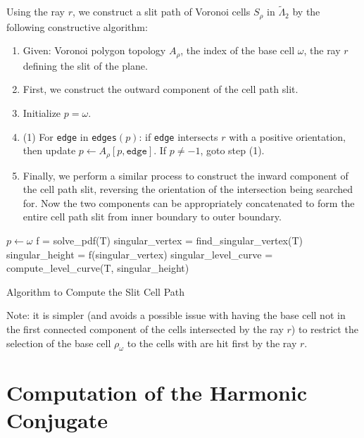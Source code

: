 \documentclass{article}
\begin{document}
Using the ray $r$, we construct a slit path of Voronoi cells $S_\rho$ in $\tilde{\Lambda}_2$ by the following constructive algorithm:
\begin{enumerate}
	\item Given: Voronoi polygon topology $A_\rho$, the index of the base cell $\omega$, the ray $r$ defining the slit of the plane.
	\item First, we construct the outward component of the cell path slit.
	\item Initialize $p = \omega$.
	\item (1) For \texttt{edge} in \texttt{edges}$(p)$:
	if \texttt{edge} intersects $r$ with a positive orientation, then update $p \leftarrow A_\rho[p, \texttt{edge}]$. If $p \ne -1$, goto step (1).
	\item Finally, we perform a similar process to construct the inward component of the cell path slit, reversing the orientation of the intersection being searched for. Now the two components can be appropriately concatenated to form the entire cell path slit from inner boundary to outer boundary.
\end{enumerate}

\begin{algorithm}%
	\SetAlgoLined
	\LinesNumbered
	\DontPrintSemicolon
	$p \leftarrow \omega$\;
	f = solve\_pdf(T)\;
	singular\_vertex = find\_singular\_vertex(T)\;
	singular\_height = f(singular\_vertex)\;
	singular\_level\_curve = compute\_level\_curve(T, singular\_height)\;
	\caption{Algorithm to Compute the Slit Cell Path}
\end{algorithm}

Note: it is simpler (and avoids a possible issue with having the base cell not in the first connected component of the cells intersected by the ray $r$) to restrict the selection of the base cell $\rho_\omega$ to the cells with are hit first by the ray $r$.

\section{Computation of the Harmonic Conjugate}
\end{document}
